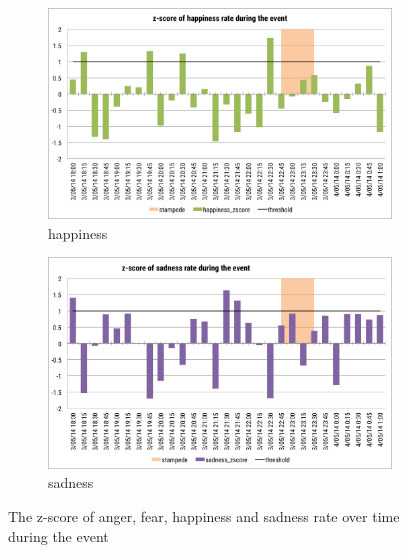 \begin{figure}[htb!]
\begin{subfigure}{0.5\textwidth}
\centering    
\includegraphics[width=0.99\linewidth]{HappinessZscoreEvent}
\caption{happiness}
\label{fig:happinessZscoreEvent}
\end{subfigure}%
\begin{subfigure}{0.5\textwidth}
\centering    
\includegraphics[width=0.99\linewidth]{SadnessZscoreEvent}
\caption{sadness}
\label{fig:sadnessZscoreEvent}
\end{subfigure}
\caption{The z-score of anger, fear, happiness and sadness rate over time during the event}
\end{figure}
